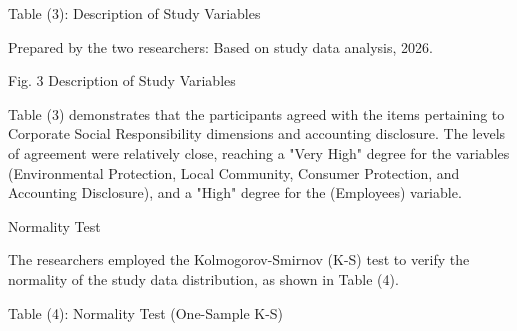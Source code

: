 \documentclass{default}
\begin{document}
Table (3): Description of Study Variables

\begin{table}[htbp]
\centering
{}
\caption{}

\end{table}

Prepared by the two researchers: Based on study data analysis, 2026.

Fig. 3 Description of Study Variables

Table (3) demonstrates that the participants agreed with the items pertaining to Corporate Social Responsibility dimensions and accounting disclosure. The levels of agreement were relatively close, reaching a "Very High" degree for the variables (Environmental Protection, Local Community, Consumer Protection, and Accounting Disclosure), and a "High" degree for the (Employees) variable.

Normality Test

The researchers employed the Kolmogorov-Smirnov (K-S) test to verify the normality of the study data distribution, as shown in Table (4).

Table (4): Normality Test (One-Sample K-S)

\begin{table}[htbp]
\centering
{}
\caption{}

\end{table}
\end{document}
